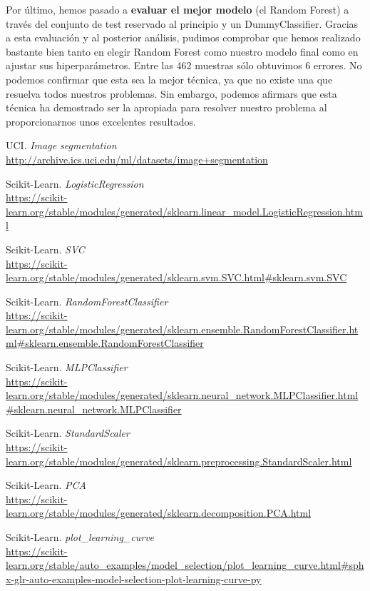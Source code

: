 \documentclass[11pt,a4paper]{article}
\begin{document}
Por último, hemos pasado a \textbf{evaluar el mejor modelo} (el Random Forest) a través del conjunto de test reservado
al principio y un DummyClassifier. Gracias a esta evaluación y al posterior análisis, pudimos comprobar que hemos realizado bastante
bien tanto en elegir Random Forest como nuestro modelo final como en ajustar sus hiperparámetros.
Entre las 462 muestras sólo obtuvimos 6 errores. No podemos confirmar que esta sea la mejor técnica, ya que no existe una que resuelva
todos nuestros problemas. Sin embargo, podemos afirmars que esta técnica ha demostrado ser la apropiada para resolver nuestro problema
al proporcionarnos unos excelentes resultados.

\newpage

\begin{thebibliography}{25}

UCI. \textit{Image segmentation}
\\\url{http://archive.ics.uci.edu/ml/datasets/image+segmentation}

Scikit-Learn. \textit{LogisticRegression}
\\\url{https://scikit-learn.org/stable/modules/generated/sklearn.linear_model.LogisticRegression.html}

Scikit-Learn. \textit{SVC}
\\\url{https://scikit-learn.org/stable/modules/generated/sklearn.svm.SVC.html#sklearn.svm.SVC}

Scikit-Learn. \textit{RandomForestClassifier}
\\\url{https://scikit-learn.org/stable/modules/generated/sklearn.ensemble.RandomForestClassifier.html#sklearn.ensemble.RandomForestClassifier}

Scikit-Learn. \textit{MLPClassifier}
\\\url{https://scikit-learn.org/stable/modules/generated/sklearn.neural_network.MLPClassifier.html#sklearn.neural_network.MLPClassifier}

Scikit-Learn. \textit{StandardScaler}
\\\url{https://scikit-learn.org/stable/modules/generated/sklearn.preprocessing.StandardScaler.html}

Scikit-Learn. \textit{PCA}
\\\url{https://scikit-learn.org/stable/modules/generated/sklearn.decomposition.PCA.html}

Scikit-Learn. \textit{plot\_learning\_curve}
\\\url{https://scikit-learn.org/stable/auto_examples/model_selection/plot_learning_curve.html#sphx-glr-auto-examples-model-selection-plot-learning-curve-py}


\end{thebibliography}
\end{document}
